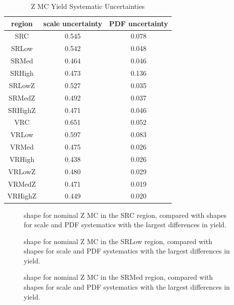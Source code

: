 \begin{table}
\caption{Z MC Yield Systematic Uncertainties}
\begin{center}
\begin{tabular}{c|c|c}
region & scale uncertainty & PDF uncertainty \\
\hline
SRC & 0.545 & 0.078 \\
SRLow & 0.542 & 0.048 \\
SRMed & 0.464 & 0.046 \\
SRHigh & 0.473 & 0.136 \\
SRLowZ & 0.527 & 0.035 \\
SRMedZ & 0.492 & 0.037 \\
SRHighZ & 0.471 & 0.046 \\
VRC & 0.651 & 0.052 \\
VRLow & 0.597 & 0.083 \\
VRMed & 0.475 & 0.026 \\
VRHigh & 0.438 & 0.026 \\
VRLowZ & 0.480 & 0.029 \\
VRMedZ & 0.471 & 0.019 \\
VRHighZ & 0.449 & 0.020 \\
\end{tabular}
\end{center}
\label{tab:ZMC_yield_systematics} 
\end{table}

\begin{figure}[tbhp]
\centering
\caption{
\mindphijm shape for nominal Z MC in the SRC region, compared with shapes for scale and PDF systematics with the largest differences in yield.
}
\label{fig:mindphijm_SRC} 
\end{figure} 

\begin{figure}[tbhp]
\centering
\caption{
\mindphijm shape for nominal Z MC in the SRLow region, compared with shapes for scale and PDF systematics with the largest differences in yield.
}
\label{fig:mindphijm_SRLow} 
\end{figure} 

\begin{figure}[tbhp]
\centering
\caption{
\mindphijm shape for nominal Z MC in the SRMed region, compared with shapes for scale and PDF systematics with the largest differences in yield.
}
\label{fig:mindphijm_SRMed} 
\end{figure} 